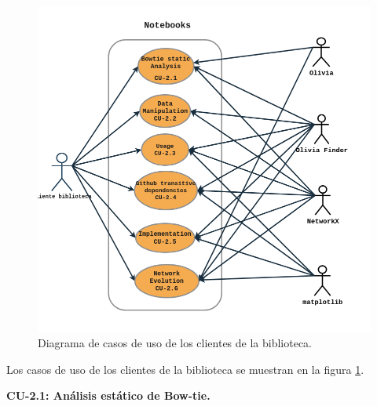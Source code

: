 \begin{figure}[ht!]
	\centering
	\includegraphics[width=1\textwidth]{img/anexos/CU_notebooks.png}
	\caption{Diagrama de casos de uso de los clientes de la biblioteca.}
	\label{fig:casos_de_uso_notebooks}
\end{figure}

Los casos de uso de los clientes de la biblioteca se muestran en la figura \ref{fig:casos_de_uso_notebooks}.


\textbf{CU-2.1: Análisis estático de Bow-tie.}

